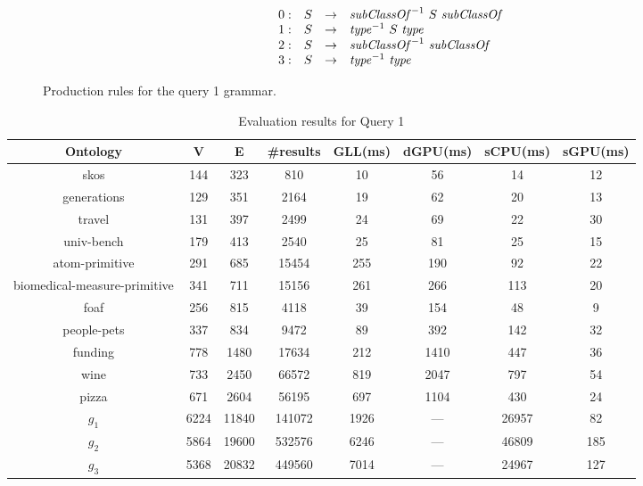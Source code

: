 \begin{figure}[h]
   \[
\begin{array}{rccl}
   0: & S & \rightarrow & \text{\textit{subClassOf}}^{-1} \ S \ \text{\textit{subClassOf}} \\ 
   1: & S & \rightarrow & \text{\textit{type}}^{-1} \ S \ \text{\textit{type}} \\ 
   2: & S & \rightarrow & \text{\textit{subClassOf}}^{-1} \ \text{\textit{subClassOf}} \\ 
   3: & S & \rightarrow & \text{\textit{type}}^{-1} \ \text{\textit{type}} \\ 
\end{array}
\]
\caption{Production rules for the query 1 grammar.}
\label{ProductionRulesQuery1}
\end{figure}

\begin{table*}[ht]
\centering
\caption{Evaluation results for Query 1}
\label{tbl1}

\begin{tabular}{ | c | c | c | c | c | c | c | c |}
\hline
Ontology & V & E & \#results & GLL(ms) & dGPU(ms) & sCPU(ms) & sGPU(ms)\\
\hline 
\hline
skos        & 144 & 323 & 810 & 10 & 56 & 14 & 12\\
generations & 129 & 351 & 2164 & 19 & 62 & 20 & 13\\
travel      & 131 & 397 & 2499 & 24 & 69 & 22 & 30\\
univ-bench  & 179 & 413 & 2540 & 25 & 81 & 25 & 15\\
atom-primitive & 291 & 685 & 15454 & 255 & 190 & 92 & 22\\
biomedical-measure-primitive & 341 & 711 & 15156 & 261 & 266 & 113 & 20\\
foaf        & 256 & 815 & 4118 & 39 & 154 & 48 & 9\\
people-pets & 337 & 834 & 9472 & 89 & 392 & 142 & 32\\
funding     & 778 & 1480 & 17634 & 212 & 1410 & 447 & 36\\
wine        & 733 & 2450 & 66572 & 819 & 2047 & 797 & 54\\
pizza       & 671 & 2604 & 56195 & 697 & 1104 & 430 & 24\\
$g_{1}$     & 6224 & 11840 & 141072 & 1926 & --- & 26957 & 82\\
$g_{2}$     & 5864 & 19600 & 532576 & 6246 & --- & 46809 & 185\\
$g_{3}$     & 5368 & 20832 & 449560 & 7014 & --- & 24967 & 127\\
\hline
\end{tabular}

\end{table*}

